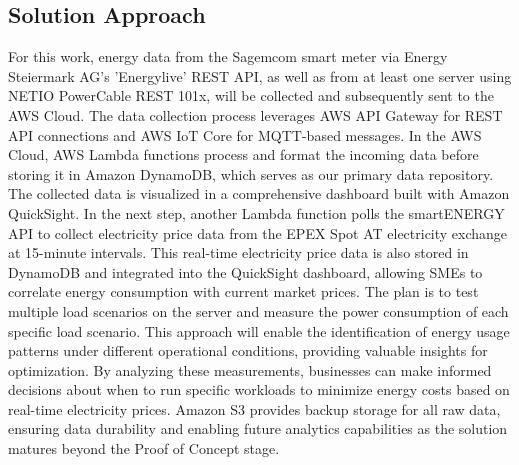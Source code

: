 \subsection{Solution Approach}
For this work, energy data from the Sagemcom smart meter via Energy Steiermark AG's 'Energylive' REST API, 
as well as from at least one server using NETIO PowerCable REST 101x, will be collected and subsequently sent to the AWS Cloud.
The data collection process leverages AWS API Gateway for REST API connections and AWS IoT Core for MQTT-based messages. 
In the AWS Cloud, AWS Lambda functions process and format the incoming data before storing it in Amazon DynamoDB, which serves as our primary data repository. 
The collected data is visualized in a comprehensive dashboard built with Amazon QuickSight. In the next step, 
another Lambda function polls the smartENERGY API to collect electricity price data from the EPEX Spot AT electricity exchange at 15-minute intervals. 
This real-time electricity price data is also stored in DynamoDB and integrated into the QuickSight dashboard, allowing SMEs to correlate energy consumption with current market prices. 
The plan is to test multiple load scenarios on the server and measure the power consumption of each specific load scenario.
This approach will enable the identification of energy usage patterns under different operational conditions, providing valuable insights for optimization.
By analyzing these measurements, businesses can make informed decisions about when to run specific workloads to minimize energy costs based on real-time electricity prices.
Amazon S3 provides backup storage for all raw data, ensuring data durability and enabling future analytics capabilities as the solution matures beyond the Proof of Concept stage.